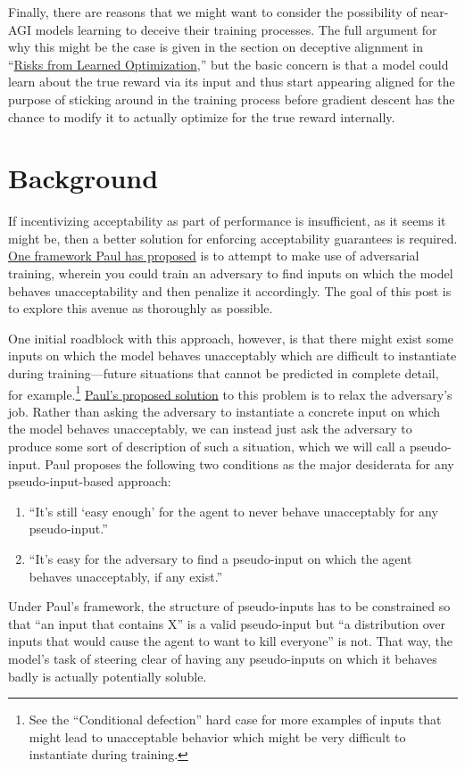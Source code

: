 \documentclass{amsart}
\begin{document}
Finally, there are reasons that we might want to consider the possibility of near-AGI models learning to deceive their training processes. The full argument for why this might be the case is given in the section on deceptive alignment in ``\href{https://arxiv.org/abs/1906.01820}{Risks from Learned Optimization},'' but the basic concern is that a model could learn about the true reward via its input and thus start appearing aligned for the purpose of sticking around in the training process before gradient descent has the chance to modify it to actually optimize for the true reward internally.

\section{Background}

If incentivizing acceptability as part of performance is insufficient, as it seems it might be, then a better solution for enforcing acceptability guarantees is required. \href{https://ai-alignment.com/training-robust-corrigibility-ce0e0a3b9b4d}{One framework Paul has proposed} is to attempt to make use of adversarial training, wherein you could train an adversary to find inputs on which the model behaves unacceptability and then penalize it accordingly. The goal of this post is to explore this avenue as thoroughly as possible.

One initial roadblock with this approach, however, is that there might exist some inputs on which the model behaves unacceptably which are difficult to instantiate during training---future situations that cannot be predicted in complete detail, for example.\footnote{See the ``Conditional defection'' hard case for more examples of inputs that might lead to unacceptable behavior which might be very difficult to instantiate during training.} \href{https://ai-alignment.com/training-robust-corrigibility-ce0e0a3b9b4d}{Paul's proposed solution} to this problem is to relax the adversary's job. Rather than asking the adversary to instantiate a concrete input on which the model behaves unacceptably, we can instead just ask the adversary to produce some sort of description of such a situation, which we will call a pseudo-input. Paul proposes the following two conditions as the major desiderata for any pseudo-input-based approach:
\begin{enumerate}
    \item ``It's still ‘easy enough' for the agent to never behave unacceptably for any pseudo-input.''
    \item ``It's easy for the adversary to find a pseudo-input on which the agent behaves unacceptably, if any exist.''
\end{enumerate}
Under Paul's framework, the structure of pseudo-inputs has to be constrained so that ``an input that contains X'' is a valid pseudo-input but ``a distribution over inputs that would cause the agent to want to kill everyone'' is not. That way, the model's task of steering clear of having any pseudo-inputs on which it behaves badly is actually potentially soluble.
\end{document}
